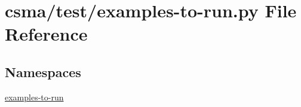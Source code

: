 \hypertarget{csma_2test_2examples-to-run_8py}{}\section{csma/test/examples-\/to-\/run.py File Reference}
\label{csma_2test_2examples-to-run_8py}
\subsection*{Namespaces}
\begin{DoxyCompactItemize}
\item 
 \hyperlink{namespaceexamples-to-run}{examples-\/to-\/run}
\end{DoxyCompactItemize}
